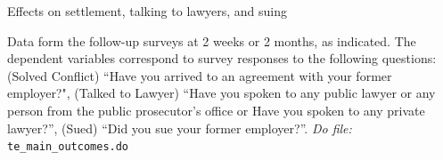 \documentclass[oneside,12pt]{article}
\begin{document}
\begin{table}[!ht]
    \caption{Effects on settlement, talking to lawyers, and suing} 
    \label{tab:7_TE_action}
    \begin{center}
    \footnotesize{}
    \end{center}
    \scriptsize {\noindent Data form the follow-up surveys at 2 weeks or 2 months, as indicated. The dependent variables correspond to survey responses to the following questions: (Solved Conflict) “Have you arrived to an agreement with your former employer?", (Talked to Lawyer) “Have you spoken to any public lawyer or any person from the public prosecutor's office or Have you spoken to any private lawyer?”, (Sued) “Did you sue your former employer?”.
    \textit{Do file: } \texttt{te\_main\_outcomes.do}}
\end{table}

\end{document}
